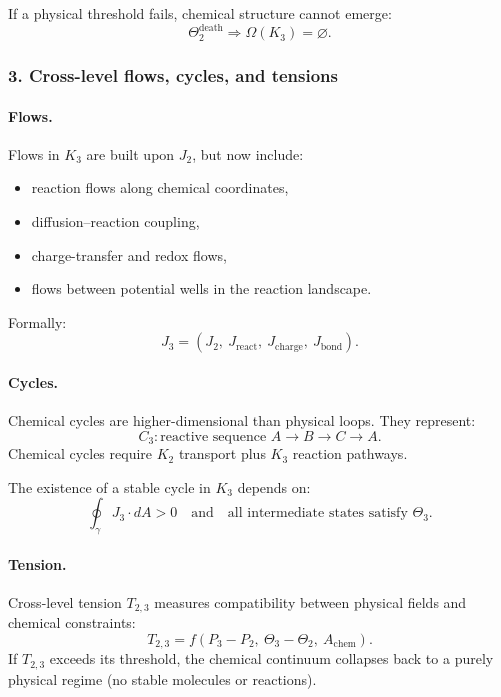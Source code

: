 If a physical threshold fails, chemical structure cannot emerge:
\[
\Theta_2^{\mathrm{death}} \Rightarrow \Omega(K_3)=\varnothing.
\]

\subsubsection{3. Cross-level flows, cycles, and tensions}

\paragraph{Flows.}
Flows in $K_3$ are built upon $J_2$, but now include:
\begin{itemize}
  \item reaction flows along chemical coordinates,
  \item diffusion–reaction coupling,
  \item charge-transfer and redox flows,
  \item flows between potential wells in the reaction landscape.
\end{itemize}

Formally:
\[
J_3 = (J_2,\ J_{\mathrm{react}},\ J_{\mathrm{charge}},\ J_{\mathrm{bond}}).
\]

\paragraph{Cycles.}
Chemical cycles are higher-dimensional than physical loops. They represent:
\[
C_3 : \text{reactive sequence } A \rightarrow B \rightarrow C \rightarrow A.
\]
Chemical cycles require $K_2$ transport plus $K_3$ reaction pathways.

The existence of a stable cycle in $K_3$ depends on:
\[
\oint_{\gamma} J_3 \cdot dA > 0
\quad\text{and}\quad
\text{all intermediate states satisfy }\Theta_3.
\]

\paragraph{Tension.}
Cross-level tension $T_{2,3}$ measures compatibility between physical fields
and chemical constraints:
\[
T_{2,3} = f(P_3 - P_2,\ \Theta_3 - \Theta_2,\ A_{\mathrm{chem}}).
\]
If $T_{2,3}$ exceeds its threshold, the chemical continuum collapses back to
a purely physical regime (no stable molecules or reactions).

